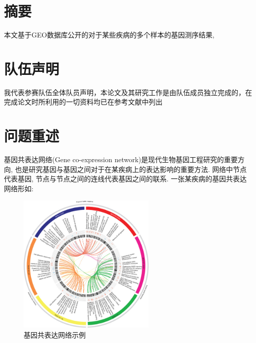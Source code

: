 \documentclass[zihao=-4]{ctexart}
\begin{document}
\normalsize
\renewcommand{\headrulewidth}{0pt}%
\newpage
\section*{摘要}

本文基于GEO数据库公开的对于某些疾病的多个样本的基因测序结果, 

\newpage

\section*{队伍声明}

我代表参赛队伍全体队员声明，本论文及其研究工作是由队伍成员独立完成的，在完成论文时所利用的一切资料均已在参考文献中列出 
\newpage
\renewcommand{\headrulewidth}{0.4pt} %
\setcounter{page}{1} 

\tableofcontents

\section{问题重述}
基因共表达网络(Gene co-expression network)是现代生物基因工程研究的重要方向, 也是研究基因与基因之间对于在某疾病上的表达影响的重要方法. 网络中节点代表基因, 节点与节点之间的连线代表基因之间的联系. 一张某疾病的基因共表达网络形如:
\begin{figure}[H]
    \centering
    \includegraphics[width=0.6\textwidth]{pic/example.jpg}
    \caption{基因共表达网络示例\cite{example}}
\end{figure}
\end{document}
